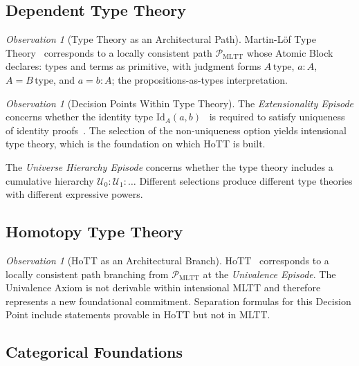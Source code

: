 \documentclass[12pt, a4paper]{article}
\theoremstyle{plain}
\theoremstyle{definition}
\theoremstyle{remark}
\newtheorem{observation}[theorem]{Observation}
\begin{document}
\subsection{Dependent Type Theory}
\label{subsec:type-theory}

\begin{observation}[Type Theory as an Architectural Path]
\label{obs:mltt-path}
Martin-L\"{o}f Type Theory~\cite{MartinLof1975,MartinLof1984}
corresponds to a locally consistent path $\mathcal{P}_{\mathrm{MLTT}}$
whose Atomic Block declares: types and terms as primitive, with
judgment forms $A\,\mathrm{type}$, $a : A$, $A = B\,\mathrm{type}$,
and $a = b : A$; the propositions-as-types interpretation.
\end{observation}

\begin{observation}[Decision Points Within Type Theory]
\label{obs:tt-episodes}
The \emph{Extensionality Episode} concerns whether the identity type
$\mathrm{Id}_A(a,b)$~\cite{MartinLof1984} is required to satisfy
uniqueness of identity proofs~\cite{MartinLof1975}. The selection of
the non-uniqueness option yields intensional type theory, which is the
foundation on which HoTT is built.

The \emph{Universe Hierarchy Episode} concerns whether the type theory
includes a cumulative hierarchy $\mathcal{U}_0 : \mathcal{U}_1 : \ldots$
Different selections produce different type theories with different
expressive powers.
\end{observation}

\subsection{Homotopy Type Theory}
\label{subsec:hott}

\begin{observation}[HoTT as an Architectural Branch]
\label{obs:hott-branch}
HoTT~\cite{HoTTBook2013,Voevodsky2010} corresponds to a locally
consistent path branching from $\mathcal{P}_{\mathrm{MLTT}}$ at the
\emph{Univalence Episode}. The Univalence Axiom is not derivable within
intensional MLTT and therefore represents a new foundational commitment.
Separation formulas for this Decision Point include statements provable
in HoTT but not in MLTT.
\end{observation}

\subsection{Categorical Foundations}
\label{subsec:categorical}
\end{document}
